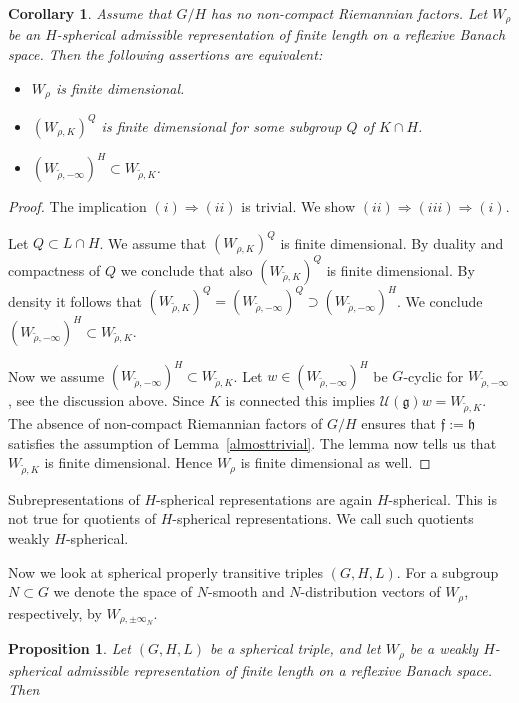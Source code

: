 \documentclass[10]{amsart}
\newtheorem{cor}[thm]{Corollary}
\newtheorem{pro}[thm]{Proposition}
\theoremstyle{remark}
\theoremstyle{definition}
\numberwithin{equation}{section}
\newcommand{\fg}{{\mathfrak g}}
\newcommand{\ff}{{\mathfrak f}}
\newcommand{\fh}{{\mathfrak h}}
\newcommand{\Cal}{\mathcal}
\begin{document}
{\begin{cor}\label{frank} Assume that $G/H$ has no non-compact Riemannian factors. Let $W_\rho$ be an $H$-spherical admissible representation of finite length on a reflexive Banach space. Then the following assertions are equivalent:
\begin{itemize}
\item[(i)] $W_\rho$ is finite dimensional.
\item[(ii)]$(W_{\rho,K})^Q$ is finite dimensional for some subgroup $Q$ of $K\cap H$.
\item[(iii)] $(W_{\tilde\rho,-\infty})^H\subset W_{\tilde\rho,K}$.
\end{itemize}
\end{cor}

\begin{proof} The implication $(i)\Rightarrow (ii)$ is trivial. We show $(ii)\Rightarrow (iii)\Rightarrow (i)$. 

 Let $Q\subset L\cap H$. We assume that $(W_{\rho,K})^Q$ is finite dimensional. By duality and compactness of $Q$ we conclude that also $(W_{\tilde\rho,K})^{Q}$ is finite dimensional. By density it follows
that $(W_{\tilde\rho,K})^{Q}=(W_{\tilde\rho,-\infty})^{Q}\supset (W_{\tilde\rho,-\infty})^{H}$. We conclude $(W_{\tilde\rho,-\infty})^{H}\subset W_{\tilde\rho,K}$.

Now we assume $(W_{\tilde\rho,-\infty})^H\subset W_{\tilde\rho,K}$. 
Let $w\in (W_{\tilde\rho,-\infty})^H$ be $G$-cyclic for $W_{\tilde\rho,-\infty}$, see the discussion above. Since $K$ is connected this implies ${\Cal U}(\fg)w=W_{\tilde\rho,K}$. The absence of non-compact Riemannian factors of $G/H$ ensures that $\ff:=\fh$ satisfies the assumption of Lemma~\ref{almosttrivial}.  The lemma  
now tells us that $W_{\tilde\rho,K}$  is finite dimensional. Hence $W_\rho$ is finite dimensional as well.
\end{proof}


Subrepresentations of $H$-spherical representations are again $H$-spherical. This is not true for quotients of $H$-spherical representations. We call such quotients weakly
$H$-spherical.

Now we look at spherical properly transitive triples $(G,H,L)$.
For a subgroup $N\subset G$ we denote the space of $N$-smooth and $N$-distribution vectors of $W_\rho$, respectively, by $W_{\rho,\pm\infty_N}$.

\begin{pro}\label{hering}
Let $(G,H,L)$ be a spherical triple, and let $W_\rho$ be a weakly $H$-spherical admissible representation of finite length on a reflexive Banach space. Then
\begin{enumerate}


\end{enumerate}
\end{pro}}
\end{document}
